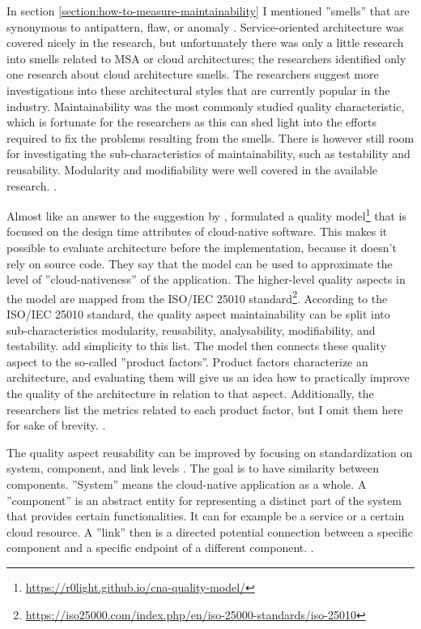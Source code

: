 \documentclass[utf8,english]{gradu3}
\begin{document}
In section \ref{section:how-to-measure-maintainability} I mentioned ''smells''
that are synonymous to antipattern, flaw, or anomaly \parencite[1]{Mumtaz2021}.
Service-oriented architecture was covered nicely in the research, but
unfortunately there was only a little research into smells related to MSA or
cloud architectures; the researchers identified only one research about cloud
architecture smells. The researchers suggest more investigations into these
architectural styles that are currently popular in the industry. Maintainability
was the most commonly studied quality characteristic, which is fortunate for the
researchers as this can shed light into the efforts required to fix the problems
resulting from the smells. There is however still room for investigating the
sub-characteristics of maintainability, such as testability and reusability.
Modularity and modifiability were well covered in the available research.
\parencite[21-22]{Mumtaz2021}.

Almost like an answer to the suggestion by \textcite{Mumtaz2021},
\textcite{Lichtenthaler2022} formulated a quality
model\footnote{\url{https://r0light.github.io/cna-quality-model/}} that is
focused on the design time attributes of cloud-native software. This makes it
possible to evaluate architecture before the implementation, because it doesn't
rely on source code. They say that the model can be used to approximate the
level of ''cloud-nativeness'' of the application. The higher-level quality
aspects in the model are mapped from the ISO/IEC 25010
standard\footnote{\url{https://iso25000.com/index.php/en/iso-25000-standards/iso-25010}}.
According to the ISO/IEC 25010 standard, the quality aspect maintainability can
be split into sub-characteristics modularity, reusability, analysability,
modifiability, and testability. \textcite{Lichtenthaler2022} add simplicity to
this list. The model then connects these quality aspect to the so-called ''product factors''.
Product factors characterize an architecture, and evaluating them will give us an idea how to practically
improve the quality of the architecture in relation to that aspect.
Additionally, the researchers list the metrics related to each product factor,
but I omit them here for sake of brevity.  \parencite{Lichtenthaler2022}.

The quality aspect reusability can be improved by focusing on standardization on
system, component, and link levels \parencite{Lichtenthaler2022}. The goal is to
have similarity between components. ''System'' means the cloud-native
application as a whole.  A ''component'' is an abstract entity for representing
a distinct part of the system that provides certain functionalities. It can for
example be a service or a certain cloud resource. A ''link'' then is
a directed potential connection between a specific component and a specific
endpoint of a different component. \parencite{Lichtenthaler2022}.
\end{document}
